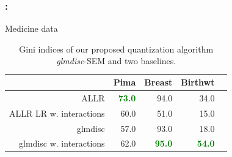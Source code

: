 \documentclass[english,xcolor={rgb,dvipsnames,table,usenames}]{beamer}
\begin{document}
\begin{frame}
\frametitle{\secname : \subsecname}

Medicine data

\begin{table}[t]
\begin{center}
\caption{Gini indices of our proposed quantization algorithm \textit{glmdisc}-SEM and two baselines.}
\label{tab:banchmark_medicine}
\begin{adjustbox}{max width=0.99\textwidth}
\begin{tabular}{rrrrr}
 & Pima & Breast & Birthwt \\ 
  \hline
ALLR & {\textcolor{green}{\textbf{73.0}}} & 94.0 & 34.0 \\ 
ALLR LR w. interactions & 60.0 & 51.0 & 15.0 \\ 
glmdisc & 57.0 & 93.0 & 18.0 \\ 
glmdisc w. interactions & 62.0 & \textcolor{green}{\textbf{95.0}} & \textcolor{green}{{\textbf{54.0}}}\\ 
\end{tabular}
\end{adjustbox}
\end{center}
\end{table}


\end{frame}
\end{document}
